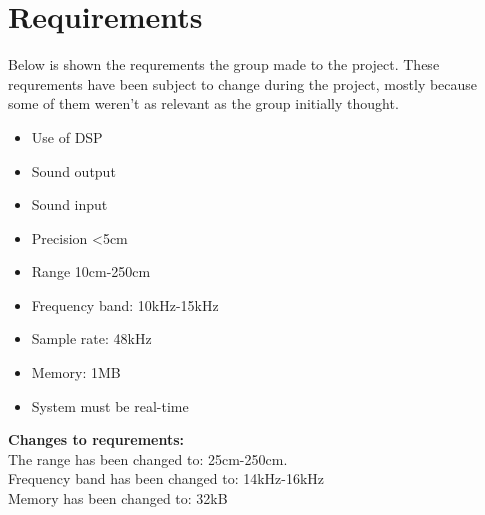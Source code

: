 \section{Requirements}
Below is shown the requrements the group made to the project. These requrements have been subject to change during the project, mostly because some of them weren't as relevant as the group initially thought.
\begin{itemize}
\item Use of DSP
\item Sound output
\item Sound input
\item Precision <5cm
\item Range 10cm-250cm
\item Frequency band: 10kHz-15kHz
\item Sample rate: 48kHz
\item Memory: 1MB
\item System must be real-time
\end{itemize}
\textbf{Changes to requrements:}\\
The range has been changed to: 25cm-250cm.\\
Frequency band has been changed to: 14kHz-16kHz\\
Memory has been changed to: 32kB\\

